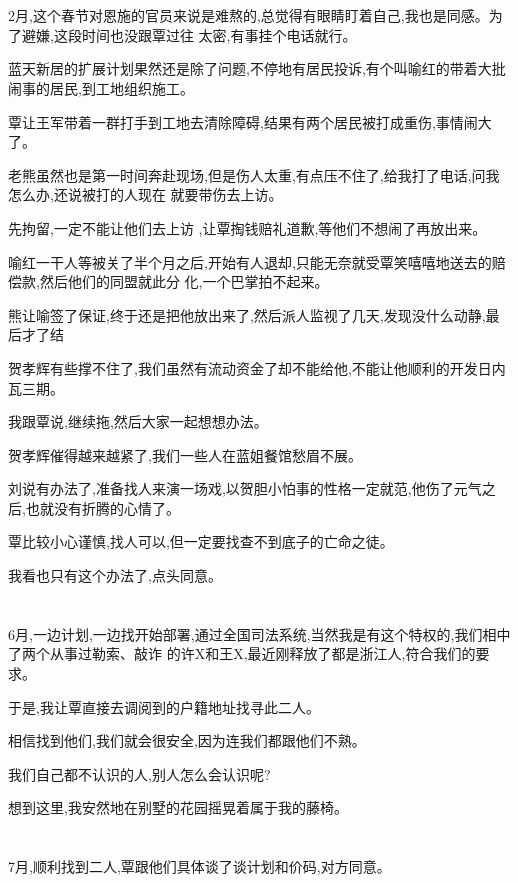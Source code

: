 \documentclass[11pt]{article}
\begin{document}
\section{}
2月,这个春节对恩施的官员来说是难熬的,总觉得有眼睛盯着自己,我也是同感。为了避嫌,这段时间也没跟覃过往
太密,有事挂个电话就行。

蓝天新居的扩展计划果然还是除了问题,不停地有居民投诉,有个叫喻红的带着大批闹事的居民,到工地组织施工。

覃让王军带着一群打手到工地去清除障碍,结果有两个居民被打成重伤,事情闹大了。

老熊虽然也是第一时间奔赴现场,但是伤人太重,有点压不住了,给我打了电话,问我怎么办,还说被打的人现在
就要带伤去上访。

先拘留,一定不能让他们去上访 ,让覃掏钱赔礼道歉,等他们不想闹了再放出来。

喻红一干人等被关了半个月之后,开始有人退却,只能无奈就受覃笑嘻嘻地送去的赔偿款,然后他们的同盟就此分
化,一个巴掌拍不起来。

熊让喻签了保证,终于还是把他放出来了,然后派人监视了几天,发现没什么动静,最后才了结

贺孝辉有些撑不住了,我们虽然有流动资金了却不能给他,不能让他顺利的开发日内瓦三期。

我跟覃说,继续拖,然后大家一起想想办法。

贺孝辉催得越来越紧了,我们一些人在蓝姐餐馆愁眉不展。

刘说有办法了,准备找人来演一场戏,以贺胆小怕事的性格一定就范,他伤了元气之后,也就没有折腾的心情了。

覃比较小心谨慎,找人可以,但一定要找查不到底子的亡命之徒。

我看也只有这个办法了,点头同意。


\section{}
6月,一边计划,一边找开始部署,通过全国司法系统,当然我是有这个特权的,我们相中了两个从事过勒索、敲诈
的许X和王X,最近刚释放了都是浙江人,符合我们的要求。

于是,我让覃直接去调阅到的户籍地址找寻此二人。

相信找到他们,我们就会很安全,因为连我们都跟他们不熟。

我们自己都不认识的人,别人怎么会认识呢?

想到这里,我安然地在别墅的花园摇晃着属于我的藤椅。

\section{}
7月,顺利找到二人,覃跟他们具体谈了谈计划和价码,对方同意。
\end{document}
